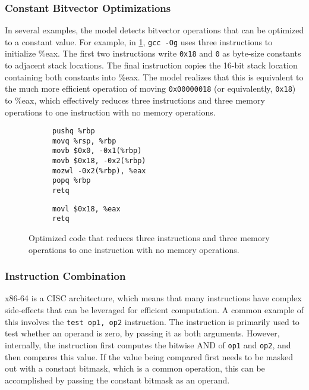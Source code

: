 \documentclass{article}
\begin{document}
\subsubsection{Constant Bitvector Optimizations}

In several examples, the model detects bitvector operations that can be optimized to a constant value.  For example, in \cref{fig:bitvector}, \texttt{gcc -Og} uses three instructions to initialize \%eax. The first two instructions write \texttt{0x18} and \texttt{0} as byte-size constants to adjacent stack locations.  The final instruction copies the 16-bit stack location containing both constants into \%eax.  The model realizes that this is equivalent to the much more efficient operation of moving \texttt{0x00000018} (or equivalently, \texttt{0x18}) to \%eax, which effectively reduces three instructions and three memory operations to one instruction with no memory operations.


\begin{figure}
\begin{subfigure}[t]{\codeboxwidth}
\begin{lstlisting}
pushq %rbp
movq %rsp, %rbp
movb $0x0, -0x1(%rbp)
movb $0x18, -0x2(%rbp)
mozwl -0x2(%rbp), %eax
popq %rbp
retq
\end{lstlisting}
\caption{\ozerocodecaption}
\end{subfigure}
\begin{subfigure}[t]{\codeboxwidth}
\begin{lstlisting}
movl $0x18, %eax
retq
\end{lstlisting}
\caption{\modelcodecaption}
\end{subfigure}
    \centering
    \caption{Optimized code that reduces three instructions and three memory operations to one instruction with no memory operations.}
    \label{fig:bitvector}
\end{figure}

\subsubsection{Instruction Combination}

x86-64 is a CISC architecture, which means that many instructions have complex side-effects that can be leveraged for efficient computation.  
%
A common example of this involves the \texttt{test op1, op2} instruction.  The instruction is primarily used to  test whether an operand is zero, by passing it as both arguments.  However, internally, the instruction first computes the bitwise AND of \texttt{op1} and \texttt{op2}, and then compares this value.   %
If the value being compared first needs to be masked out with a constant bitmask, which is a common operation, this can be accomplished by passing the constant bitmask as an operand.
\end{document}
